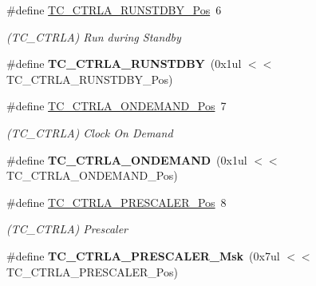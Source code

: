 \begin{DoxyCompactItemize}
\item 
\hypertarget{group___s_a_m_l21___t_c_gaa484fe3eae496075906d152ffbe64025}{}\#define \hyperlink{group___s_a_m_l21___t_c_gaa484fe3eae496075906d152ffbe64025}{T\+C\+\_\+\+C\+T\+R\+L\+A\+\_\+\+R\+U\+N\+S\+T\+D\+B\+Y\+\_\+\+Pos}~6\label{group___s_a_m_l21___t_c_gaa484fe3eae496075906d152ffbe64025}

\begin{DoxyCompactList}\small\item\em (T\+C\+\_\+\+C\+T\+R\+L\+A) Run during Standby \end{DoxyCompactList}\item 
\hypertarget{group___s_a_m_l21___t_c_gab15dadfa08a62289008d4a50972ab159}{}\#define {\bfseries T\+C\+\_\+\+C\+T\+R\+L\+A\+\_\+\+R\+U\+N\+S\+T\+D\+B\+Y}~(0x1ul $<$$<$ T\+C\+\_\+\+C\+T\+R\+L\+A\+\_\+\+R\+U\+N\+S\+T\+D\+B\+Y\+\_\+\+Pos)\label{group___s_a_m_l21___t_c_gab15dadfa08a62289008d4a50972ab159}

\item 
\hypertarget{group___s_a_m_l21___t_c_gaeb186f9100a7e6241604675dc1c25e25}{}\#define \hyperlink{group___s_a_m_l21___t_c_gaeb186f9100a7e6241604675dc1c25e25}{T\+C\+\_\+\+C\+T\+R\+L\+A\+\_\+\+O\+N\+D\+E\+M\+A\+N\+D\+\_\+\+Pos}~7\label{group___s_a_m_l21___t_c_gaeb186f9100a7e6241604675dc1c25e25}

\begin{DoxyCompactList}\small\item\em (T\+C\+\_\+\+C\+T\+R\+L\+A) Clock On Demand \end{DoxyCompactList}\item 
\hypertarget{group___s_a_m_l21___t_c_ga7f0a8e83a81d4c8cfe74cf7a7486805f}{}\#define {\bfseries T\+C\+\_\+\+C\+T\+R\+L\+A\+\_\+\+O\+N\+D\+E\+M\+A\+N\+D}~(0x1ul $<$$<$ T\+C\+\_\+\+C\+T\+R\+L\+A\+\_\+\+O\+N\+D\+E\+M\+A\+N\+D\+\_\+\+Pos)\label{group___s_a_m_l21___t_c_ga7f0a8e83a81d4c8cfe74cf7a7486805f}

\item 
\hypertarget{group___s_a_m_l21___t_c_ga99d3a0239aaa0aecd6d8bec41fd4ce05}{}\#define \hyperlink{group___s_a_m_l21___t_c_ga99d3a0239aaa0aecd6d8bec41fd4ce05}{T\+C\+\_\+\+C\+T\+R\+L\+A\+\_\+\+P\+R\+E\+S\+C\+A\+L\+E\+R\+\_\+\+Pos}~8\label{group___s_a_m_l21___t_c_ga99d3a0239aaa0aecd6d8bec41fd4ce05}

\begin{DoxyCompactList}\small\item\em (T\+C\+\_\+\+C\+T\+R\+L\+A) Prescaler \end{DoxyCompactList}\item 
\hypertarget{group___s_a_m_l21___t_c_gad63c64ce39329e49a101ba680ed3a954}{}\#define {\bfseries T\+C\+\_\+\+C\+T\+R\+L\+A\+\_\+\+P\+R\+E\+S\+C\+A\+L\+E\+R\+\_\+\+Msk}~(0x7ul $<$$<$ T\+C\+\_\+\+C\+T\+R\+L\+A\+\_\+\+P\+R\+E\+S\+C\+A\+L\+E\+R\+\_\+\+Pos)\label{group___s_a_m_l21___t_c_gad63c64ce39329e49a101ba680ed3a954}


\end{DoxyCompactItemize}
